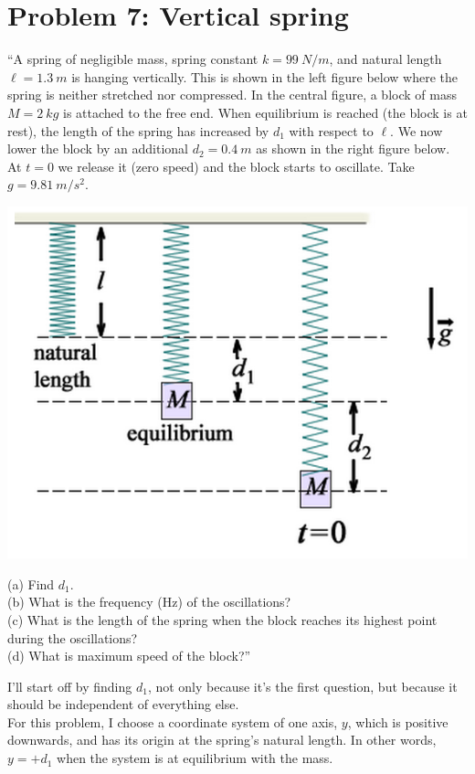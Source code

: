 \documentclass[12pt,a4paper]{report}
\begin{document}
\section{Problem 7: Vertical spring}

``A spring of negligible mass, spring constant $k = \SI{99}{N/m}$, and natural length $\ell = \SI{1.3}{m}$ is hanging vertically. This is shown in the left figure below where the spring is neither stretched nor compressed. In the central figure, a block of mass $M = \SI{2}{kg}$ is attached to the free end. When equilibrium is reached (the block is at rest), the length of the spring has increased by $d_1$ with respect to $\ell$. We now lower the block by an additional $d_2 = \SI{0.4}{m}$ as shown in the right figure below. At $t = 0$ we release it (zero speed) and the block starts to oscillate. Take $g = \SI{9.81}{m/s^2}$.

\begin{center}
\includegraphics[scale=0.6]{Graphics/h4p7}
\end{center}

(a) Find $d_1$.\\
(b) What is the frequency (Hz) of the oscillations?\\
(c) What is the length of the spring when the block reaches its highest point during the oscillations?\\
(d) What is maximum speed of the block?''

I'll start off by finding $d_1$, not only because it's the first question, but because it should be independent of everything else.\\
For this problem, I choose a coordinate system of one axis, $y$, which is positive downwards, and has its origin at the spring's natural length. In other words, $y = + d_1$ when the system is at equilibrium with the mass.
\end{document}
